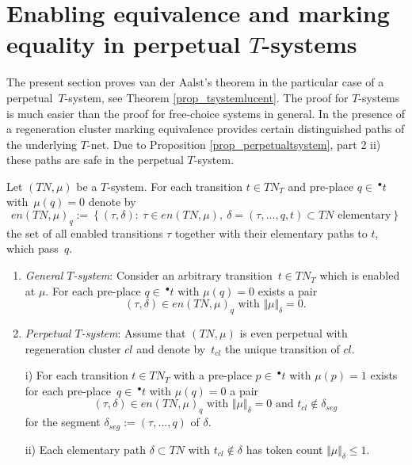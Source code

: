 \documentclass{fundam}
\begin{document}
\section{Enabling equivalence and marking equality in perpetual $T$-systems}\label{sect_tsystemsperpetualitymarkings}

The present section proves van der Aalst's theorem in the particular case of a \mbox{perpetual $T$-system}, see Theorem \ref{prop_tsystemlucent}. The proof for $T$-systems is much easier than the proof for free-choice systems in general. In the presence of a regeneration cluster marking equivalence provides certain distinguished paths of the underlying $T$-net. Due to Proposition \ref{prop_perpetualtsystem}, part 2 ii) these paths are safe in the perpetual $T$-system.

\begin{proposition}\label{prop_perpetualtsystem}
Let $(TN,\mu)$ be a $T$-system. For each transition $t\in TN_T$ and pre-place $q \in\ ^\bullet t$ \mbox{with $\mu(q)=0$} denote by
$$en(TN,\mu)_q:=\left\{(\tau,\delta):\ \tau \in en(TN,\mu),\ \delta=(\tau,...,q,t) \subset TN \text{ elementary}\right\}$$
the set of all enabled transitions $\tau$ together with their elementary paths to $t$, which \mbox{pass $q$}.
\begin{enumerate}
\item \emph{General $T$-system}: Consider an arbitrary \mbox{transition $t\in TN_T$} which is enabled at $\mu$. For each pre-place $q \in\ ^\bullet t \text{ with } \mu(q)=0$ exists a pair
$$(\tau,\delta) \in en(TN,\mu)_q \text{ with } \Vert \mu \Vert_\delta =0.$$
\item \emph{Perpetual $T$-system}: Assume that $(TN,\mu)$ is even perpetual with regeneration cluster $cl$ and denote \mbox{by $t_{cl}$} the unique transition of $cl$.
\begin{flushleft}
i) For each transition $t\in TN_T$ with a pre-place $p\in \ ^\bullet t$ with $\mu(p)=1$ exists for each \mbox{pre-place $q \in\ ^\bullet t$} with $\mu(q)=0$ a pair
$$(\tau,\delta) \in en(TN,\mu)_q \text{ with } \Vert \mu \Vert_\delta =0 \text{ and } t_{cl} \notin \delta_{seg}$$
for the segment $\delta_{seg}:=(\tau,...,q)$ of $\delta$.

ii) Each elementary path $\delta \subset TN$ with $t_{cl} \notin \delta$ has token count $\Vert \mu \Vert_\delta \leq 1$.
\end{flushleft}
\end{enumerate}
\end{proposition}
\end{document}
